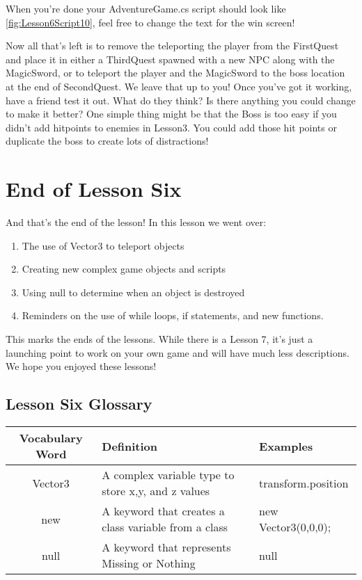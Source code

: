 \documentclass{article}
\begin{document}
When you're done your AdventureGame.cs script should look like \ref{fig:Lesson6Script10}, feel free to change the text for the win screen!

\noindent{}

Now all that's left is to remove the teleporting the player from the FirstQuest and place it in either a ThirdQuest spawned with a new NPC along with the MagicSword, or to teleport the player and the MagicSword to the boss location at the end of SecondQuest. We leave that up to you! Once you've got it working, have a friend test it out. What do they think? Is there anything you could change to make it better? One simple thing might be that the Boss is too easy if you didn't add hitpoints to enemies in Lesson3. You could add those hit points or duplicate the boss to create lots of distractions!

\section{End of Lesson Six}

And that's the end of the lesson! In this lesson we went over:

\begin{enumerate}
 \item The use of Vector3 to teleport objects
 \item Creating new complex game objects and scripts
 \item Using null to determine when an object is destroyed
 \item Reminders on the use of while loops, if statements, and new functions.
\end{enumerate}

This marks the ends of the lessons. While there is a Lesson 7, it's just a launching point to work on your own game and will have much less descriptions. We hope you enjoyed these lessons!

\subsection{Lesson Six Glossary}
\begin{center}
\begin{tabular}{ | c | m{5cm}  | m{5cm} | } 
 \hline
 Vocabulary Word & Definition & Examples \\ 
  \hline
  Vector3 & A complex variable type to store x,y, and z values & transform.position \\ 
  \hline
 new & A keyword that creates a class variable from a class & new Vector3(0,0,0); \\ 
  \hline
 null & A keyword that represents Missing or Nothing & null \\ 
  \hline
\end{tabular}
\end{center}
\end{document}
